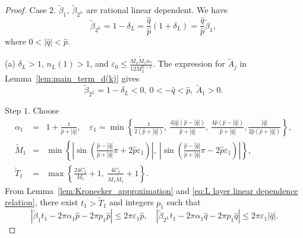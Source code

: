 \documentclass[11pt,reqno]{amsart}
\theoremstyle{definition}
\theoremstyle{remark}
\numberwithin{equation}{section}
\begin{document}
\begin{proof}
	
Case $2$. $\tilde{\beta}_1,~\tilde{\beta}_{2^L}$ are rational linear dependent. We have  
\begin{equation}\label{eq:L layer linear dependence relation}
  \tilde{\beta}_{2^L}=1-\delta_L=\frac{\hat{q}}{\hat{p}}\left(1+\delta_L\right)=\frac{\hat{q}}{\hat{p}}\tilde{\beta}_1,~
\end{equation}
where $0<|\hat{q}|<\hat{p}$.

(a) $\delta_L>1$, $n_L(1)>1$, and $\varepsilon_0\leq \frac{M_1\widetilde{M}_1n_{*}}{12M_2^{L-1}}$. The expression for $\tilde{A}_j$ in Lemma~\ref{lem:main_term_d(k)} gives
\begin{equation*}\label{eq:L layer subcase  first set up}
    \tilde{\beta}_{2^L}=1-\delta_L<0,~0<-\hat{q}<\hat{p},~\tilde{A}_1>0.~
\end{equation*}

Step $1$. Choose  
\begin{eqnarray}\label{eq:L layer linear dependence Kronecker set up}
     \alpha_1&=&1+\frac{1}{\hat{p}+|\hat{q}|}, \quad \varepsilon_1=\min\left\{\frac{1}{2(\hat{p}+|\hat{q}|)},~\frac{4|\hat{q}|(\hat{p}-|\hat{q}|)}{\hat{p}+|\hat{q}|},~\frac{4\hat{p}(\hat{p}-|\hat{q}|)}{\hat{p}+|\hat{q}|}, \frac{|\hat{q}|}{2\hat{p}(\hat{p}+|\hat{q}|)}\right\}, \nonumber~\\
     \widetilde{M}_1&=&\min\left\{ \left|\sin\left(\frac{\hat{p}-|\hat{q}|}{\hat{p}+|\hat{q}|}\pi+2\hat{p}\varepsilon_1\right)\right|,~\left|\sin\left(\frac{\hat{p}-|\hat{q}|}{\hat{p}+|\hat{q}|}\pi-2\hat{p}\varepsilon_1\right)\right|\right\},\\
     \widetilde{T}_1&=&\max\left\{\frac{24C_1}{M_1}+1,~\frac{4C_1}{M_1\widetilde{M}_1}+1\right\}. \nonumber
\end{eqnarray}
From Lemma~\ref{lem:Kronecker_approximation} and \eqref{eq:L layer linear dependence relation}, 
there exist $t_1 > \widetilde{T}_1$ and integers $p_1$ such that
\begin{equation}\label{eq:L layer linear dependence subcase a Kronecker inequality}
\left| \tilde{\beta}_1t_1-2\pi\alpha_1\hat{p}-2\pi p_1\hat{p} \right|\leq 2\pi\varepsilon_1\hat{p},\quad
\left| \tilde{\beta}_{2^L}t_1-2\pi\alpha_1\hat{q}-2\pi p_1\hat{q} \right|\leq 2\pi\varepsilon_1|\hat{q}|.
\end{equation}


\end{proof}
\end{document}
